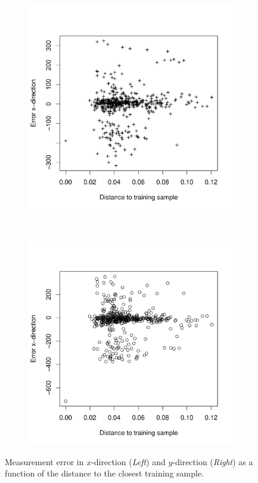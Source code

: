 \documentclass{report}
\begin{document}
\begin{figure}
  \label{fig:cor_sim_confi}
  \centering
  \begin{subfigure}[b]{0.5\textwidth}
  \includegraphics[width=1\textwidth]{dependency_dist_error_x}
  \label{fig:cosinesim}
  \end{subfigure}%
~
  \begin{subfigure}[b]{0.5\textwidth}
  \includegraphics[width=1\textwidth]{dependency_dist_error_y}
  \label{fig:cosinesd}
  \end{subfigure}
  \caption{Measurement error in $x$-direction (\emph{Left}) and
    $y$-direction (\emph{Right}) as a function of the distance to the
    closest training sample.}
\label{fig:cosine}
\end{figure}
\end{document}
